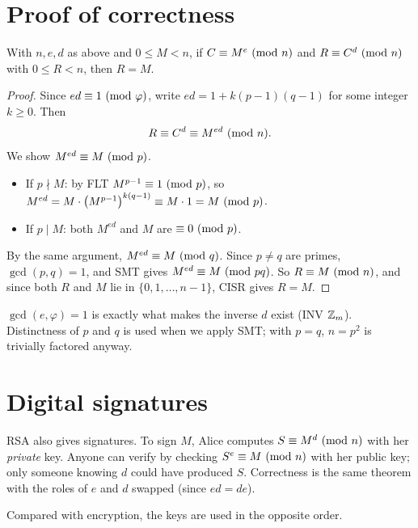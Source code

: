 \section{Proof of correctness}

\begin{theorem}
With $n, e, d$ as above and $0 \le M < n$, if $C \equiv M^e \ (\mathrm{mod}\ n)$ and $R \equiv C^d\ (\mathrm{mod}\ n)$
with $0 \le R < n$, then $R = M$.
\end{theorem}

\begin{proof}
Since $ed \equiv 1 \ (\mathrm{mod}\ \varphi)$, write $ed = 1 + k(p-1)(q-1)$ for some integer $k\ge 0$. Then
\[ R \equiv C^d \equiv M^{ed} \ (\mathrm{mod}\ n). \]
We show $M^{ed} \equiv M \ (\mathrm{mod}\ p)$.
\begin{itemize}
  \item If $p \nmid M$: by FLT $M^{p-1} \equiv 1 \ (\mathrm{mod}\ p)$, so
        $M^{ed} = M\cdot\bigl(M^{p-1}\bigr)^{k(q-1)} \equiv M\cdot 1 = M \ (\mathrm{mod}\ p)$.
  \item If $p \mid M$: both $M^{ed}$ and $M$ are $\equiv 0 \ (\mathrm{mod}\ p)$.
\end{itemize}
By the same argument, $M^{ed} \equiv M \ (\mathrm{mod}\ q)$. Since $p \neq q$ are primes,
$\gcd(p,q) = 1$, and SMT gives $M^{ed} \equiv M \ (\mathrm{mod}\ pq)$. So $R \equiv M \ (\mathrm{mod}\ n)$, and since both
$R$ and $M$ lie in $\{0, 1, \dots, n-1\}$, CISR gives $R = M$.
\end{proof}

\begin{important}[Why $p \ne q$ and $\gcd(e,\varphi) = 1$]
$\gcd(e,\varphi) = 1$ is exactly what makes the inverse $d$ exist (INV $\mathbb{Z}_{m}$). Distinctness
of $p$ and $q$ is used when we apply SMT; with $p = q$, $n = p^2$ is trivially factored
anyway.
\end{important}

\section{Digital signatures}

RSA also gives signatures. To sign $M$, Alice computes $S \equiv M^{d} \ (\mathrm{mod}\ n)$ with her
\emph{private} key. Anyone can verify by checking $S^{e} \equiv M \ (\mathrm{mod}\ n)$ with her public key;
only someone knowing $d$ could have produced $S$. Correctness is the same theorem with the roles
of $e$ and $d$ swapped (since $ed = de$).

\begin{center}
\end{center}
Compared with encryption, the keys are used in the opposite order.

